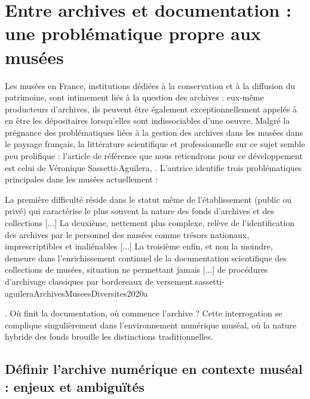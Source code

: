 \section{Entre archives et documentation : une problématique propre aux musées}

Les musées en France, institutions dédiées à la conservation et à la diffusion du patrimoine, sont intimement liés à la question des archives : eux-même producteurs d'archives, ils peuvent être également exceptionnellement appelés à en être les dépositaires lorsqu'elles sont indissociables d'une oeuvre. Malgré la prégnance des problématiques liées à la gestion des archives dans les musées dans le paysage français, la littérature scientifique et professionnelle sur ce sujet semble peu prolifique : l'article de référence que nous retiendrons pour ce développement est celui de Véronique Sassetti-Aguilera, . L'autrice identifie trois problématiques principales dans les musées actuellement : 

\begin{myquote}
	{La première difficulté réside dans le statut même de l'établissement (public ou privé) qui caractérise le plus souvent la nature des fonds d'archives et des collections [...] La deuxième, nettement plus complexe, relève de l'identification des archives par le personnel des musées comme trésors nationaux, imprescriptibles et inaliénables [...] La troisième enfin, et non la moindre, demeure dans l'enrichissement continuel de la documentation scientifique des collections de musées, situation ne permettant jamais [...] de procédures d'archivage classiques par bordereaux de versement.}{sassetti-aguileraArchivesMuseesDiversites2020a}
\end{myquote}. Où finit la documentation, où commence l'archive ? Cette interrogation se complique singulièrement dans l'environnement numérique muséal, où la nature hybride des fonds brouille les distinctions traditionnelles.

\subsection{Définir l’archive numérique en contexte muséal : enjeux et ambiguïtés}

